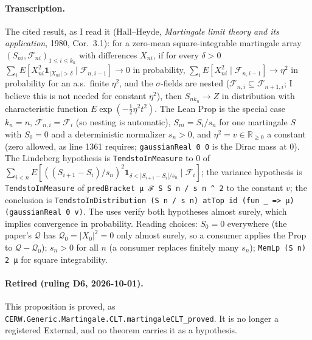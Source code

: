 \paragraph{Transcription.} The cited result, as I read it (Hall--Heyde, \emph{Martingale limit theory and its application}, 1980, Cor.~3.1): for a zero-mean
square-integrable martingale array $(S_{ni},\mathcal F_{ni})_{1\le i\le k_n}$ with differences $X_{ni}$, if for every $\delta>0$
$\sum_iE[X_{ni}^2\mathbf 1_{|X_{ni}|>\delta}\mid\mathcal F_{n,i-1}]\to0$ in probability, $\sum_iE[X_{ni}^2\mid\mathcal F_{n,i-1}]\to\eta^2$ in
probability for an a.s.\ finite $\eta^2$, and the $\sigma$-fields are nested ($\mathcal F_{n,i}\subseteq\mathcal F_{n+1,i}$; I believe this is not needed for constant
$\eta^2$), then $S_{nk_n}\to Z$ in distribution with characteristic function $E\exp(-\tfrac12\eta^2t^2)$. The Lean Prop is the special case $k_n=n$,
$\mathcal F_{n,i}=\mathcal F_i$ (so nesting is automatic), $S_{ni}=S_i/s_n$ for one martingale $S$ with $S_0=0$ and a deterministic
normalizer $s_n>0$, and $\eta^2=v\in\mathbb R_{\ge0}$ a constant (zero allowed, as line 1361 requires; \texttt{gaussianReal 0 0} is the Dirac mass at $0$). The Lindeberg
hypothesis is \texttt{TendstoInMeasure} to $0$ of $\sum_{i<n}E[((S_{i+1}-S_i)/s_n)^2\mathbf 1_{\delta<|S_{i+1}-S_i|/s_n}\mid\mathcal F_i]$; the variance
hypothesis is \texttt{TendstoInMeasure} of \texttt{predBracket μ ℱ S S n / s n ^ 2} to the constant $v$; the conclusion is
\texttt{TendstoInDistribution (S n / s n) atTop id (fun _ => μ) (gaussianReal 0 v)}. The uses verify both hypotheses almost surely, which implies
convergence in probability. Reading choices: $S_0=0$ everywhere (the paper's $\mathcal Q$ has $\mathcal Q_0=|X_0|^2=0$ only almost surely, so a consumer applies the Prop to $\mathcal Q-\mathcal Q_0$);
$s_n>0$ for all $n$ (a consumer replaces finitely many $s_n$); \texttt{MemLp (S n) 2 μ} for square integrability.
\paragraph{Retired (ruling D6, 2026-10-01).} This proposition is proved, as \texttt{CERW.Generic.Martingale.CLT.martingaleCLT\_proved}. It is no longer a registered External, and no theorem carries it as a hypothesis.
